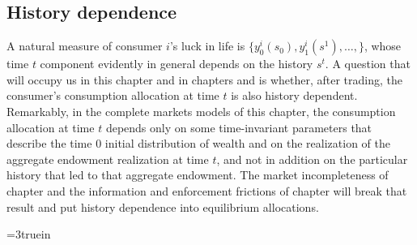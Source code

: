 \subsection{History dependence}
  A natural measure of consumer
$i$'s luck in life is  $\{y^i_0(s_0), y^i_1(s^1), \ldots,\}$, whose time $t$ component
evidently in general depends on the history $s^t$. A
question that will occupy us in this chapter and in chapters
 and
 is whether, after trading, the consumer's
consumption allocation at time $t$ is also history dependent.  Remarkably, in
the complete markets models of this chapter, the consumption
allocation  at time $t$  depends only on some time-invariant parameters that describe the time $0$  initial distribution of wealth and
on the realization of the aggregate
endowment realization at time $t$, and  not in addition  on the particular history that led to that aggregate endowment.
 The market incompleteness of chapter
 and the  information and enforcement frictions of
chapter  will break that result and put
history dependence into equilibrium allocations.



\centerline{\epsfxsize=3truein} \caption{The
commodity space with Arrow securities.  At date $t=2$, there are
trades in time $3$ goods for only those time $t=3$ nodes that can
be reached from the realized time $t=2$ history $(0,0, 1)$.}
\endfigure

